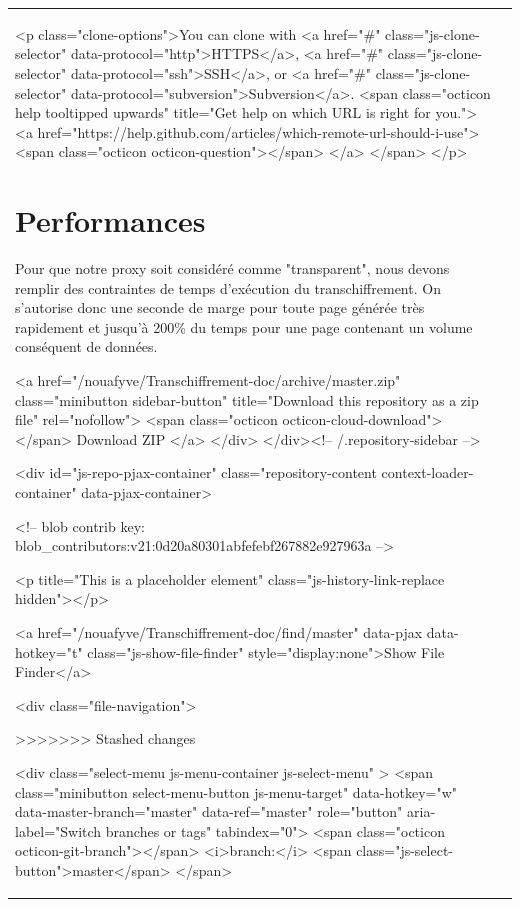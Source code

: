 \documentclass[a4paper,11pt,french]{article}
\begin{document}
\begin{tabular}{|m{8cm}|m{8cm}|}
<p class="clone-options">You can clone with
      <a href="#" class="js-clone-selector" data-protocol="http">HTTPS</a>,
      <a href="#" class="js-clone-selector" data-protocol="ssh">SSH</a>,
      or <a href="#" class="js-clone-selector" data-protocol="subversion">Subversion</a>.
  <span class="octicon help tooltipped upwards" title="Get help on which URL is right for you.">
    <a href="https://help.github.com/articles/which-remote-url-should-i-use">
    <span class="octicon octicon-question"></span>
    </a>
  </span>
</p>


\section{Performances}
Pour que notre proxy soit considéré comme "transparent", nous devons remplir des contraintes de temps d'exécution du transchiffrement.
On s'autorise donc une seconde de marge pour toute page générée très rapidement et jusqu'à 200\% du temps pour une page contenant un volume conséquent de données.

              <a href="/nouafyve/Transchiffrement-doc/archive/master.zip"
                 class="minibutton sidebar-button"
                 title="Download this repository as a zip file"
                 rel="nofollow">
                <span class="octicon octicon-cloud-download"></span>
                Download ZIP
              </a>
            </div>
        </div><!-- /.repository-sidebar -->

        <div id="js-repo-pjax-container" class="repository-content context-loader-container" data-pjax-container>
          


<!-- blob contrib key: blob_contributors:v21:0d20a80301abfefebf267882e927963a -->

<p title="This is a placeholder element" class="js-history-link-replace hidden"></p>

<a href="/nouafyve/Transchiffrement-doc/find/master" data-pjax data-hotkey="t" class="js-show-file-finder" style="display:none">Show File Finder</a>

<div class="file-navigation">
  
>>>>>>> Stashed changes

<div class="select-menu js-menu-container js-select-menu" >
  <span class="minibutton select-menu-button js-menu-target" data-hotkey="w"
    data-master-branch="master"
    data-ref="master"
    role="button" aria-label="Switch branches or tags" tabindex="0">
    <span class="octicon octicon-git-branch"></span>
    <i>branch:</i>
    <span class="js-select-button">master</span>
  </span>


\end{tabular}
\end{document}
